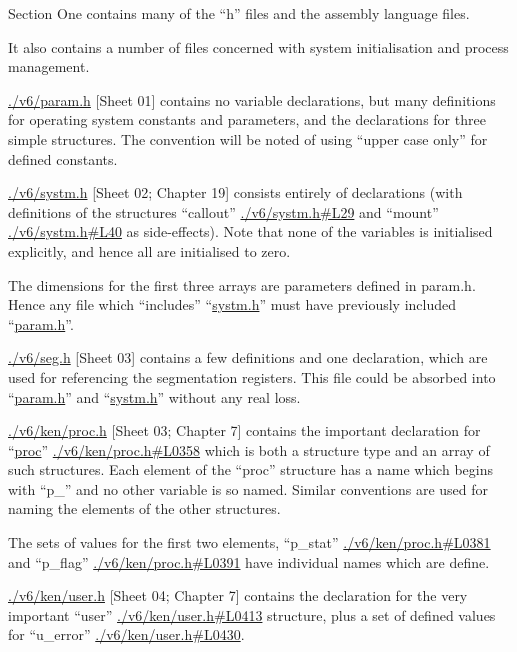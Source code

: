 
Section One contains many of the ``h''
files and the assembly language files.

It also contains a number of files concerned 
with system initialisation and
process management.


\bd
\item[param.h] \url{./v6/param.h} [Sheet 01] contains no variable 
declarations, but many definitions 
for operating system constants
and parameters, and the declarations
for three simple structures. The
convention will be noted of using
``upper case only'' for defined constants.


\item[systm.h] \url{./v6/systm.h} [Sheet 02; Chapter 19] consists 
entirely of declarations (with
definitions of the structures ``callout'' \url{./v6/systm.h#L29}
and ``mount'' \url{./v6/systm.h#L40} as side-effects).
Note that none of the variables is
initialised explicitly, and hence
all are initialised to zero.

The dimensions for the first three
arrays are parameters defined in
param.h. Hence any file which
``includes'' ``\href{./v6/systm.h}{systm.h}'' must have
previously included ``\href{./v6/param.h}{param.h}''.

\item[seg.h] \url{./v6/seg.h} [Sheet 03] contains a few
definitions and one declaration,
which are used for referencing the
segmentation registers. This file
could be absorbed into ``\href{./v6/param.h}{param.h}'' and
``\href{./v6/systm.h}{systm.h}'' without any real loss.

\item[proc.h] \url{./v6/ken/proc.h} [Sheet 03; Chapter 7] contains 
the important declaration for
``\href{./v6/proc.h#L26}{proc}'' \url{./v6/ken/proc.h#L0358} which is both a structure
type and an array of such structures.
Each element of the ``proc''
structure has a name which begins
with ``p\_'' and no other variable is
so named. Similar conventions are
used for naming the elements of the
other structures.

The sets of values for the first two
elements, ``p\_stat'' \url{./v6/ken/proc.h#L0381} and ``p\_flag'' \url{./v6/ken/proc.h#L0391}
have individual names which are
define.


\item[user.h] \url{./v6/ken/user.h} [Sheet 04; Chapter 7] contains 
the declaration for the very
important ``user'' \url{./v6/ken/user.h#L0413} structure, plus a
set of defined values for ``u\_error'' \url{./v6/ken/user.h#L0430}.


